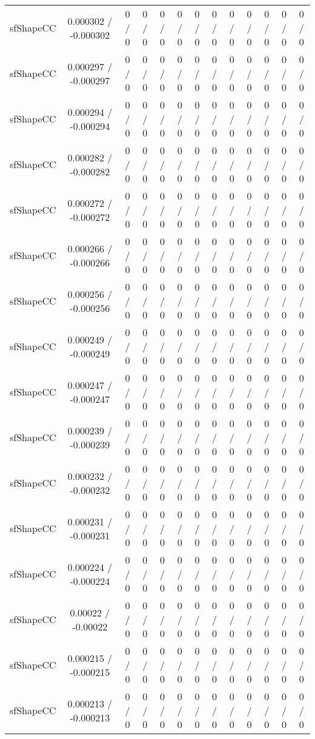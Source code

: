 \documentclass[10pt]{article}
\begin{document}
\begin{table}[htbp]
\begin{center}
\begin{tabular}{|c|c|c|c|c|c|c|c|c|c|c|c|c|}
  sfShapeCC & 0.000302 / -0.000302 & 0 / 0 & 0 / 0 & 0 / 0 & 0 / 0 & 0 / 0 & 0 / 0 & 0 / 0 & 0 / 0 & 0 / 0 & 0 / 0 & 0 / 0 \\ 
  sfShapeCC & 0.000297 / -0.000297 & 0 / 0 & 0 / 0 & 0 / 0 & 0 / 0 & 0 / 0 & 0 / 0 & 0 / 0 & 0 / 0 & 0 / 0 & 0 / 0 & 0 / 0 \\ 
  sfShapeCC & 0.000294 / -0.000294 & 0 / 0 & 0 / 0 & 0 / 0 & 0 / 0 & 0 / 0 & 0 / 0 & 0 / 0 & 0 / 0 & 0 / 0 & 0 / 0 & 0 / 0 \\ 
  sfShapeCC & 0.000282 / -0.000282 & 0 / 0 & 0 / 0 & 0 / 0 & 0 / 0 & 0 / 0 & 0 / 0 & 0 / 0 & 0 / 0 & 0 / 0 & 0 / 0 & 0 / 0 \\ 
  sfShapeCC & 0.000272 / -0.000272 & 0 / 0 & 0 / 0 & 0 / 0 & 0 / 0 & 0 / 0 & 0 / 0 & 0 / 0 & 0 / 0 & 0 / 0 & 0 / 0 & 0 / 0 \\ 
  sfShapeCC & 0.000266 / -0.000266 & 0 / 0 & 0 / 0 & 0 / 0 & 0 / 0 & 0 / 0 & 0 / 0 & 0 / 0 & 0 / 0 & 0 / 0 & 0 / 0 & 0 / 0 \\ 
  sfShapeCC & 0.000256 / -0.000256 & 0 / 0 & 0 / 0 & 0 / 0 & 0 / 0 & 0 / 0 & 0 / 0 & 0 / 0 & 0 / 0 & 0 / 0 & 0 / 0 & 0 / 0 \\ 
  sfShapeCC & 0.000249 / -0.000249 & 0 / 0 & 0 / 0 & 0 / 0 & 0 / 0 & 0 / 0 & 0 / 0 & 0 / 0 & 0 / 0 & 0 / 0 & 0 / 0 & 0 / 0 \\ 
  sfShapeCC & 0.000247 / -0.000247 & 0 / 0 & 0 / 0 & 0 / 0 & 0 / 0 & 0 / 0 & 0 / 0 & 0 / 0 & 0 / 0 & 0 / 0 & 0 / 0 & 0 / 0 \\ 
  sfShapeCC & 0.000239 / -0.000239 & 0 / 0 & 0 / 0 & 0 / 0 & 0 / 0 & 0 / 0 & 0 / 0 & 0 / 0 & 0 / 0 & 0 / 0 & 0 / 0 & 0 / 0 \\ 
  sfShapeCC & 0.000232 / -0.000232 & 0 / 0 & 0 / 0 & 0 / 0 & 0 / 0 & 0 / 0 & 0 / 0 & 0 / 0 & 0 / 0 & 0 / 0 & 0 / 0 & 0 / 0 \\ 
  sfShapeCC & 0.000231 / -0.000231 & 0 / 0 & 0 / 0 & 0 / 0 & 0 / 0 & 0 / 0 & 0 / 0 & 0 / 0 & 0 / 0 & 0 / 0 & 0 / 0 & 0 / 0 \\ 
  sfShapeCC & 0.000224 / -0.000224 & 0 / 0 & 0 / 0 & 0 / 0 & 0 / 0 & 0 / 0 & 0 / 0 & 0 / 0 & 0 / 0 & 0 / 0 & 0 / 0 & 0 / 0 \\ 
  sfShapeCC & 0.00022 / -0.00022 & 0 / 0 & 0 / 0 & 0 / 0 & 0 / 0 & 0 / 0 & 0 / 0 & 0 / 0 & 0 / 0 & 0 / 0 & 0 / 0 & 0 / 0 \\ 
  sfShapeCC & 0.000215 / -0.000215 & 0 / 0 & 0 / 0 & 0 / 0 & 0 / 0 & 0 / 0 & 0 / 0 & 0 / 0 & 0 / 0 & 0 / 0 & 0 / 0 & 0 / 0 \\ 
  sfShapeCC & 0.000213 / -0.000213 & 0 / 0 & 0 / 0 & 0 / 0 & 0 / 0 & 0 / 0 & 0 / 0 & 0 / 0 & 0 / 0 & 0 / 0 & 0 / 0 & 0 / 0 \\ 

\end{tabular}
\end{center}
\end{table}
\end{document}
